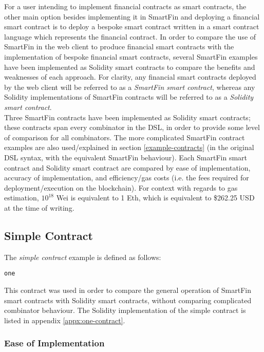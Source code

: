 For a user intending to implement financial contracts as smart contracts, the other main option besides implementing it in SmartFin and deploying a financial smart contract is to deploy a bespoke smart contract written in a smart contract language which represents the financial contract. In order to compare the use of SmartFin in the web client to produce financial smart contracts with the implementation of bespoke financial smart contracts, several SmartFin examples have been implemented as Solidity smart contracts to compare the benefits and weaknesses of each approach. For clarity, any financial smart contracts deployed by the web client will be referred to as a \textit{SmartFin smart contract}, whereas any Solidity implementations of SmartFin contracts will be referred to as a \textit{Solidity smart contract}. \\

Three SmartFin contracts have been implemented as Solidity smart contracts; these contracts span every combinator in the DSL, in order to provide some level of comparison for all combinators. The more complicated SmartFin contract examples are also used/explained in section \ref{example-contracts} (in the original DSL syntax, with the equivalent SmartFin behaviour). Each SmartFin smart contract and Solidity smart contract are compared by ease of implementation, accuracy of implementation, and efficiency/gas costs (i.e. the fees required for deployment/execution on the blockchain). For context with regards to gas estimation, $10^{18}$ Wei is equivalent to 1 Eth, which is equivalent to \$262.25 USD at the time of writing\cite{eth-usd}.

\subsection{Simple Contract}

The \textit{simple contract} example is defined as follows:

\begin{Verbatim}[frame=single, samepage=true, rulecolor=\textcolor{black!50}]
one
\end{Verbatim}

This contract was used in order to compare the general operation of SmartFin smart contracts with Solidity smart contracts, without comparing complicated combinator behaviour. The Solidity implementation of the simple contract is listed in appendix \ref{appx:one-contract}.


\subsubsection{Ease of Implementation}

